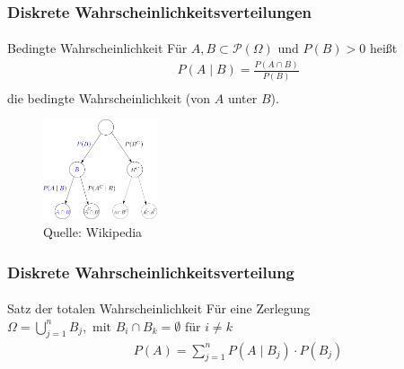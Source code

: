 \documentclass{beamer}
\begin{document}
\begin{frame}
    \frametitle{Diskrete Wahrscheinlichkeitsverteilungen}
\framesubtitle{}

\begin{block}{Bedingte  Wahrscheinlichkeit}
Für $A,B \subset \mathcal{P}(\Omega)$ und $P(B) > 0$ heißt
\begin{align*}
& P(A \; | \;  B) = \frac{P(A \cap B)}{P(B)} \\
\end{align*}
die bedingte Wahrscheinlichkeit (von $A$ unter $B$).
\end{block}


\begin{figure}[htp]
      \centering
    \includegraphics[width=0.3\textwidth]{img/Probability_tree}

      \caption{Quelle: Wikipedia}
\end{figure}

 \end{frame}




\begin{frame}
    \frametitle{Diskrete Wahrscheinlichkeitsverteilung}
\framesubtitle{}

\begin{block}{Satz der totalen Wahrscheinlichkeit}
Für eine Zerlegung  $\Omega = \bigcup_{j=1}^{n} B_j, \text{ mit } B_i \cap B_k = \emptyset \text{ für } i \neq k $
\begin{align*}
& P(A ) = \sum_{j=1}^{n}  P(A \; | \;  B_j) \cdot P(B_j)
\end{align*}
\end{block}

 \end{frame}
\end{document}
